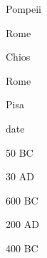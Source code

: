 \documentclass[compress,color=usenames]{beamer}
\begin{document}
\begin{frame}
Pompeii



Rome



Chios



Rome



Pisa






date



50 BC



30 AD



600 BC



200 AD



400 BC










\end{frame}
\end{document}
